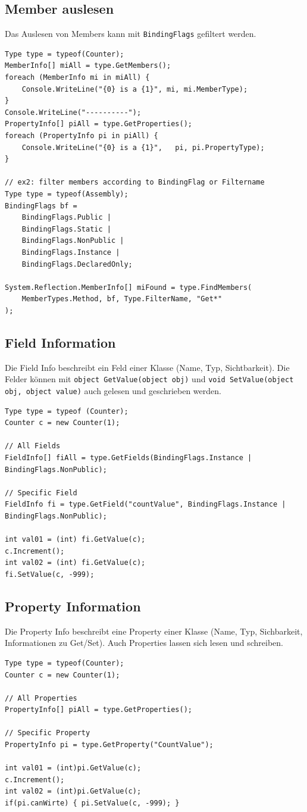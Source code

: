 \documentclass[
a4paper,
oneside,
10pt,
fleqn,
headsepline,
toc=listofnumbered, 
bibliography=totocnumbered]{scrartcl}
\begin{document}
\subsection{Member auslesen}
Das Auslesen von Members kann mit \lstinline|BindingFlags| gefiltert werden.
\begin{lstlisting}[caption=Reflection: Members auslesen]
Type type = typeof(Counter);
MemberInfo[] miAll = type.GetMembers();
foreach (MemberInfo mi in miAll) {
	Console.WriteLine("{0} is a {1}", mi, mi.MemberType);
}
Console.WriteLine("----------");
PropertyInfo[] piAll = type.GetProperties();
foreach (PropertyInfo pi in piAll) {
	Console.WriteLine("{0} is a {1}",	pi, pi.PropertyType);
}

// ex2: filter members according to BindingFlag or Filtername
Type type = typeof(Assembly);
BindingFlags bf =
	BindingFlags.Public |
	BindingFlags.Static |
	BindingFlags.NonPublic |
	BindingFlags.Instance |
	BindingFlags.DeclaredOnly;

System.Reflection.MemberInfo[] miFound = type.FindMembers(
	MemberTypes.Method, bf, Type.FilterName, "Get*"
);
\end{lstlisting}

\subsection{Field Information}
Die Field Info beschreibt ein Feld einer Klasse (Name, Typ, Sichtbarkeit). Die Felder können mit \lstinline|object GetValue(object obj)| und \lstinline|void SetValue(object obj, object value)| auch gelesen und geschrieben werden.

\begin{lstlisting}[caption=Reflection: Field Info]
Type type = typeof (Counter);
Counter c = new Counter(1);

// All Fields
FieldInfo[] fiAll = type.GetFields(BindingFlags.Instance | BindingFlags.NonPublic);
	
// Specific Field
FieldInfo fi = type.GetField("countValue", BindingFlags.Instance | 	BindingFlags.NonPublic);
	
int val01 = (int) fi.GetValue(c);
c.Increment();
int val02 = (int) fi.GetValue(c);
fi.SetValue(c, -999);
\end{lstlisting}


\subsection{Property Information}
Die Property Info beschreibt eine Property einer Klasse (Name, Typ, Sichbarkeit, Informationen zu Get/Set). Auch Properties lassen sich lesen und schreiben.
\begin{lstlisting}[caption=Reflection: Property Info]
Type type = typeof(Counter);
Counter c = new Counter(1);

// All Properties
PropertyInfo[] piAll = type.GetProperties();

// Specific Property
PropertyInfo pi = type.GetProperty("CountValue");

int val01 = (int)pi.GetValue(c);
c.Increment();
int val02 = (int)pi.GetValue(c);
if(pi.canWirte) { pi.SetValue(c, -999); }
\end{lstlisting}
\end{document}
